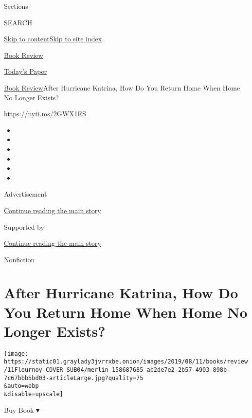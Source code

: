 Sections

SEARCH

\protect\hyperlink{site-content}{Skip to
content}\protect\hyperlink{site-index}{Skip to site index}

\href{https://www.nytimes3xbfgragh.onion/section/books/review}{Book
Review}

\href{https://myaccount.nytimes3xbfgragh.onion/auth/login?response_type=cookie\&client_id=vi}{}

\href{https://www.nytimes3xbfgragh.onion/section/todayspaper}{Today's
Paper}

\href{/section/books/review}{Book Review}\textbar{}After Hurricane
Katrina, How Do You Return Home When Home No Longer Exists?

\url{https://nyti.ms/2GWX1ES}

\begin{itemize}
\item
\item
\item
\item
\item
\item
\end{itemize}

Advertisement

\protect\hyperlink{after-top}{Continue reading the main story}

Supported by

\protect\hyperlink{after-sponsor}{Continue reading the main story}

Nonfiction

\hypertarget{after-hurricane-katrina-how-do-you-return-home-when-home-no-longer-exists}{%
\section{After Hurricane Katrina, How Do You Return Home When Home No
Longer
Exists?}\label{after-hurricane-katrina-how-do-you-return-home-when-home-no-longer-exists}}

\texttt{[image: https://static01.graylady3jvrrxbe.onion/images/2019/08/11/books/review/11Flournoy-COVER\_SUB04/merlin\_158687685\_ab2de7e2-2b57-4903-898b-7c67bbb5bd03-articleLarge.jpg?quality=75\\\&auto=webp\\\&disable=upscale]}

Buy Book ▾

